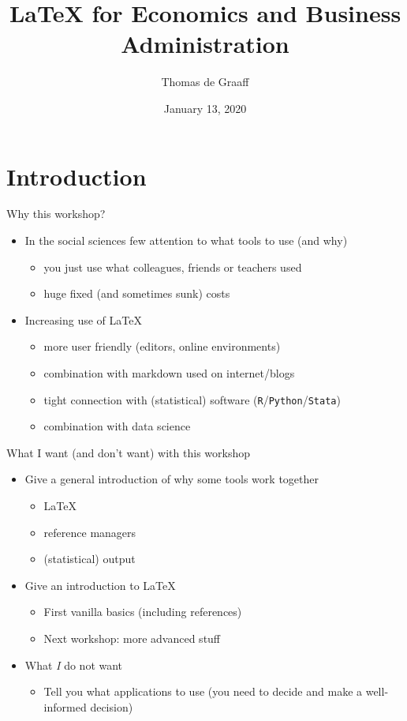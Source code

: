 \documentclass[ignorenonframetext]{beamer}
\title{\LaTeX{} for Economics and Business Administration}
\author{Thomas de Graaff}
\date{January 13, 2020}
\begin{document}
\frame{\titlepage}

\section{Introduction}\label{introduction}

\begin{frame}{Why this workshop?}

\begin{itemize}
\item
  In the \alert{social sciences} few attention to what tools to use (and why)
    \begin{itemize}
      \item you just use what colleagues, friends or teachers used
      \item huge fixed (and sometimes sunk) costs \newline \pause
    \end{itemize}
\item
  Increasing use of \LaTeX{}
  \begin{itemize}
    \item more user friendly (editors, online environments)
    \item combination with markdown used on internet/blogs
    \item tight connection with (statistical) software (\texttt{R}/\texttt{Python}/\texttt{Stata})
    \item combination with \alert{data science}
  \end{itemize}
\end{itemize}
\end{frame}

\begin{frame}{What I want (and don't want) with this workshop}

\begin{itemize}
\item
  Give a general introduction of why some tools work together

  \begin{itemize}
  \item \LaTeX{}
  \item reference managers
  \item (statistical) output
  \end{itemize}
\item
  Give an introduction to \LaTeX{}

  \begin{itemize}
	  \item First \alert{vanilla basics} (including references)
	  \item Next workshop: more advanced stuff
  \end{itemize}
\item
  What \emph{I} do not want

  \begin{itemize}
  \item
    Tell you what applications to use (\alert{you} need to decide and make a \alert{well-informed} decision)
  \end{itemize}
\end{itemize}

\end{frame}
\end{document}
